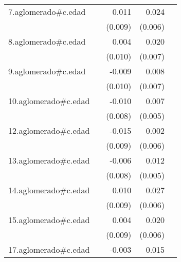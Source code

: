{\begin{longtable}{l*{4}{D{.}{.}{-1}}}
\addlinespace
7.aglomerado#c.edad&                     &       0.011         &       0.024\sym{***}&                     \\
            &                     &     (0.009)         &     (0.006)         &                     \\
\addlinespace
8.aglomerado#c.edad&                     &       0.004         &       0.020\sym{**} &                     \\
            &                     &     (0.010)         &     (0.007)         &                     \\
\addlinespace
9.aglomerado#c.edad&                     &      -0.009         &       0.008         &                     \\
            &                     &     (0.010)         &     (0.007)         &                     \\
\addlinespace
10.aglomerado#c.edad&                     &      -0.010         &       0.007         &                     \\
            &                     &     (0.008)         &     (0.005)         &                     \\
\addlinespace
12.aglomerado#c.edad&                     &      -0.015         &       0.002         &                     \\
            &                     &     (0.009)         &     (0.006)         &                     \\
\addlinespace
13.aglomerado#c.edad&                     &      -0.006         &       0.012\sym{**} &                     \\
            &                     &     (0.008)         &     (0.005)         &                     \\
\addlinespace
14.aglomerado#c.edad&                     &       0.010         &       0.027\sym{***}&                     \\
            &                     &     (0.009)         &     (0.006)         &                     \\
\addlinespace
15.aglomerado#c.edad&                     &       0.004         &       0.020\sym{***}&                     \\
            &                     &     (0.009)         &     (0.006)         &                     \\
\addlinespace
17.aglomerado#c.edad&                     &      -0.003         &       0.015         &                     \\

\end{longtable}}
